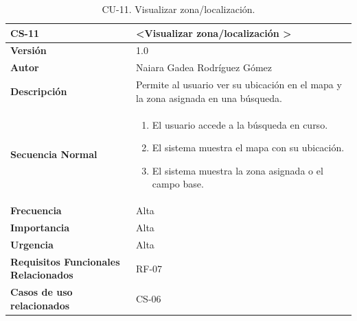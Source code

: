 \begin{table}[htbp] %
\centering
\begin{tabular}{ |m{3cm}|m{11cm}|  } 
\hline
\cellcolor[HTML]{B9E3F0}\centering\textbf{CS-11} & \cellcolor[HTML]{B9E3F0}\textbf{\textless Visualizar zona/localización \textgreater}\\

\hline
\cellcolor[HTML]{EFEFEF}\textbf{Versión}             & 1.0  \\
\hline
\cellcolor[HTML]{EFEFEF}\textbf{Autor}                & Naiara Gadea Rodríguez Gómez\\
\hline
\cellcolor[HTML]{EFEFEF}\textbf{Descripción}                & { Permite al usuario ver su ubicación en el mapa y la zona asignada en una búsqueda. }\\
\hline
\cellcolor[HTML]{EFEFEF}\textbf{Secuencia \newline Normal}                &                 
        \begin{enumerate}
            \item El usuario accede a la búsqueda en curso.
            \item El sistema muestra el mapa con su ubicación.
            \item El sistema muestra la zona asignada o el campo base.
        \end{enumerate}\\
\hline
\cellcolor[HTML]{EFEFEF}\textbf{Frecuencia}                & Alta\\
\hline
\cellcolor[HTML]{EFEFEF}\textbf{Importancia}                & Alta\\
\hline
\cellcolor[HTML]{EFEFEF}\textbf{Urgencia}                & Alta\\
\hline
\cellcolor[HTML]{EFEFEF}\textbf{Requisitos Funcionales Relacionados}                & { RF-07 }\\
\hline
\cellcolor[HTML]{EFEFEF}\textbf{Casos de uso relacionados}                & { CS-06 }\\
\hline
\end{tabular}
\caption{CU-11. Visualizar zona/localización.}
\end{table}



